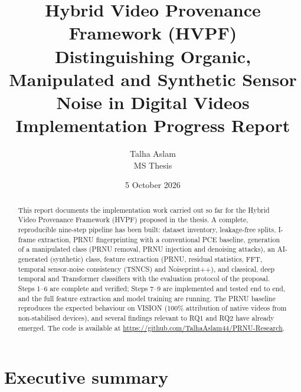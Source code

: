 \documentclass[11pt,a4paper]{article}
\title{\textbf{Hybrid Video Provenance Framework (HVPF)}\\[4pt]
\large Distinguishing Organic, Manipulated and Synthetic Sensor Noise in Digital Videos\\[2pt]
\large Implementation Progress Report}
\author{Talha Aslam\\ MS Thesis}
\date{5 October 2026}
\begin{document}
\maketitle

\begin{abstract}
\noindent This report documents the implementation work carried out so far for the Hybrid Video
Provenance Framework (HVPF) proposed in the thesis. A complete, reproducible nine-step pipeline has
been built: dataset inventory, leakage-free splits, I-frame extraction, PRNU fingerprinting with a
conventional PCE baseline, generation of a manipulated class (PRNU removal, PRNU injection and
denoising attacks), an AI-generated (synthetic) class, feature extraction (PRNU, residual statistics,
FFT, temporal sensor-noise consistency (TSNCS) and Noiseprint++), and classical, deep temporal and
Transformer classifiers with the evaluation protocol of the proposal. Steps 1--6 are complete and
verified; Steps 7--9 are implemented and tested end to end, and the full feature extraction and model
training are running. The PRNU baseline reproduces the expected behaviour on VISION (100\% attribution
of native videos from non-stabilised devices), and several findings relevant to RQ1 and RQ2 have
already emerged. The code is available at
\url{https://github.com/TalhaAslam44/PRNU-Research}.
\end{abstract}

\tableofcontents
\newpage

\section{Executive summary}
\end{document}
